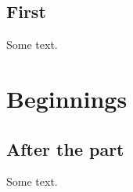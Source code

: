 \documentclass{report}
\begin{document}
\tableofcontents
\chapter{First}
Some text.
\part{Beginnings}
\chapter{After the part}
Some text.
\end{document}
